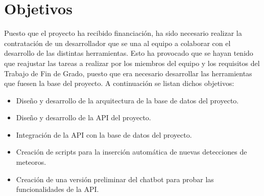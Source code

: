 \vspace{0.5cm}



\section{Objetivos}

Puesto que el proyecto ha recibido financiación, ha sido necesario realizar la contratación de un desarrollador que se una al equipo a colaborar con el desarrollo de las distintas herramientas. Esto ha provocado que se hayan tenido que reajustar las tareas a realizar por los miembros del equipo y  los requisitos del Trabajo de Fin de Grado, puesto que era necesario desarrollar las herramientas que fuesen la base del proyecto. A continuación se listan dichos objetivos:



\begin{itemize}
    \item Diseño y desarrollo de la arquitectura de la base de datos del proyecto.
    \item Diseño y desarrollo de la API del proyecto.
    \item Integración de la API con la base de datos del proyecto.
    \item Creación de scripts para la inserción automática de nuevas detecciones de meteoros.
    \item Creación de una versión preliminar del chatbot para probar las funcionalidades de la API.
\end{itemize}

